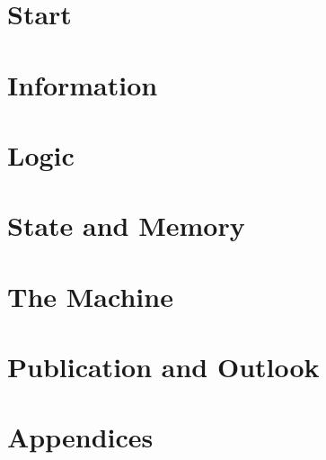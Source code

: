 \documentclass[11pt,twoside,openright]{book}
\begin{document}
\frontmatter


\tableofcontents




\mainmatter
\setcounter{chapter}{-1}

\part{Start}




\part{Information}






\part{Logic}






\part{State and Memory}






\part{The Machine}






\part{Publication and Outlook}



\appendix
\part{Appendices}







\backmatter

\end{document}
